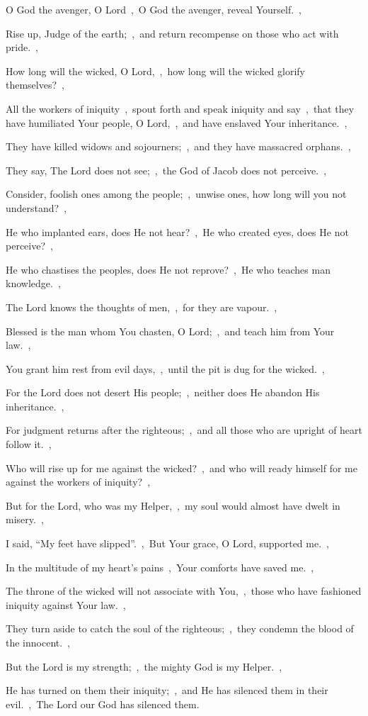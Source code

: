 \documentclass[12pt,twoside,a5paper]{article}
\begin{document}
\begin{halfparskip}
   O God the avenger, O Lord~\sep\ O God the avenger, reveal Yourself.~\sep

  Rise up, Judge of the earth;~\sep\ and return recompense on those who act with pride.~\sep

  How long will the wicked, O Lord,~\sep\ how long will the wicked glorify themselves?~\sep

  All the workers of iniquity~\sep\ spout forth and speak iniquity and say~\sep\ that they have humiliated Your people, O Lord,~\sep\ and have enslaved Your inheritance.~\sep

  They have killed widows and sojourners;~\sep\ and they have massacred orphans.~\sep

  They say, The Lord does not see;~\sep\ the God of Jacob does not perceive.~\sep

  Consider, foolish ones among the people;~\sep\ unwise ones, how long will you not understand?~\sep

  He who implanted ears, does He not hear?~\sep\ He who created eyes, does He not perceive?~\sep

  He who chastises the peoples, does He not reprove?~\sep\ He who teaches man knowledge.~\sep

  The Lord knows the thoughts of men,~\sep\ for they are vapour.~\sep

  Blessed is the man whom You chasten, O Lord;~\sep\ and teach him from Your law.~\sep

  You grant him rest from evil days,~\sep\ until the pit is dug for the wicked.~\sep

  For the Lord does not desert His people;~\sep\ neither does He abandon His inheritance.~\sep

  For judgment returns after the righteous;~\sep\ and all those who are upright of heart follow it.~\sep

  Who will rise up for me against the wicked?~\sep\ and who will ready himself for me against the workers of iniquity?~\sep

  But for the Lord, who was my Helper,~\sep\ my soul would almost have dwelt in misery.~\sep

  I said, ``My feet have slipped''.~\sep\ But Your grace, O Lord, supported me.~\sep

  In the multitude of my heart's pains~\sep\ Your comforts have saved me.~\sep

  The throne of the wicked will not associate with You,~\sep\ those who have fashioned iniquity against Your law.~\sep

  They turn aside to catch the soul of the righteous;~\sep\ they condemn the blood of the innocent.~\sep

  But the Lord is my strength;~\sep\ the mighty God is my Helper.~\sep

  He has turned on them their iniquity;~\sep\ and He has silenced them in their evil.~\sep\ The Lord our God has silenced them.
\end{halfparskip}
\end{document}
